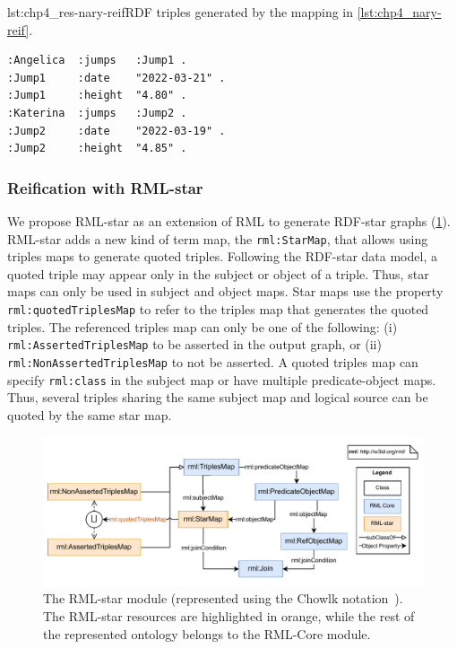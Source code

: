 \begin{minipage}{\linewidth}
\begin{captionedlisting}{lst:chp4_res-nary-reif}{RDF triples generated by the mapping in \cref{lst:chp4_nary-reif}.}
\centering
\begin{multicols}{2}
{\begin{lstlisting}[basicstyle=\ttfamily\small,label={list:example1},columns=flexible]
:Angelica  :jumps   :Jump1 .
:Jump1     :date    "2022-03-21" .
:Jump1     :height  "4.80" .
:Katerina  :jumps   :Jump2 .
:Jump2     :date    "2022-03-19" .
:Jump2     :height  "4.85" .
\end{lstlisting}}
\end{multicols}
\end{captionedlisting}
\end{minipage}




\subsubsection{Reification with RML-star}



We propose RML-star as an extension of RML to generate \mbox{RDF-star} graphs (\cref{fig:chp4-3_rml-star}). 
\mbox{RML-star} adds a new kind of term map, the \texttt{rml:StarMap}, that allows using triples maps to generate quoted triples. 
Following the \mbox{RDF-star} data model,
a quoted triple may appear only in the subject or object of a triple.
Thus, star maps can only be used in subject and object maps.
Star maps use the property \texttt{rml:quotedTriplesMap} to refer to the triples map that generates the quoted triples. 
The referenced triples map can only be one of the following: (i) \texttt{rml:AssertedTriplesMap} to be asserted in the output graph, or (ii) \texttt{rml:NonAssertedTriplesMap} to not be asserted. A quoted triples map can specify \texttt{rml:class} in the subject map or have multiple predicate-object maps.
Thus, several triples sharing the same subject map and logical source can be quoted by the same star map.

\begin{figure}[!t]
\centering
\includegraphics[width=1\linewidth]{figures/chp4-3_rml-star_diagram.pdf}
\caption[RML-star module]{The \mbox{RML-star} module (represented using the Chowlk notation~\citep{feria2022chowlk}). The RML-star resources are highlighted in orange, while the rest of the represented ontology belongs to the RML-Core module.}
\label{fig:chp4-3_rml-star}
\end{figure}



